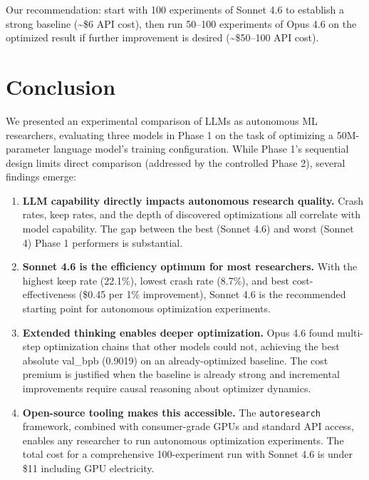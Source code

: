 \documentclass[11pt]{article}
\begin{document}
Our recommendation: start with 100 experiments of Sonnet 4.6 to establish a strong baseline (\textasciitilde\$6 API cost), then run 50--100 experiments of Opus 4.6 on the optimized result if further improvement is desired (\textasciitilde\$50--100 API cost).

\section{Conclusion}
\label{sec:conclusion}

We presented an experimental comparison of LLMs as autonomous ML researchers, evaluating three models in Phase 1 on the task of optimizing a 50M-parameter language model's training configuration. While Phase 1's sequential design limits direct comparison (addressed by the controlled Phase 2), several findings emerge:

\begin{enumerate}[leftmargin=*]
    \item \textbf{LLM capability directly impacts autonomous research quality.} Crash rates, keep rates, and the depth of discovered optimizations all correlate with model capability. The gap between the best (Sonnet 4.6) and worst (Sonnet 4) Phase 1 performers is substantial.

    \item \textbf{Sonnet 4.6 is the efficiency optimum for most researchers.} With the highest keep rate (22.1\%), lowest crash rate (8.7\%), and best cost-effectiveness (\$0.45 per 1\% improvement), Sonnet 4.6 is the recommended starting point for autonomous optimization experiments.

    \item \textbf{Extended thinking enables deeper optimization.} Opus 4.6 found multi-step optimization chains that other models could not, achieving the best absolute val\_bpb (0.9019) on an already-optimized baseline. The cost premium is justified when the baseline is already strong and incremental improvements require causal reasoning about optimizer dynamics.

    \item \textbf{Open-source tooling makes this accessible.} The \texttt{autoresearch} framework, combined with consumer-grade GPUs and standard API access, enables any researcher to run autonomous optimization experiments. The total cost for a comprehensive 100-experiment run with Sonnet 4.6 is under \$11 including GPU electricity.
\end{enumerate}
\end{document}
